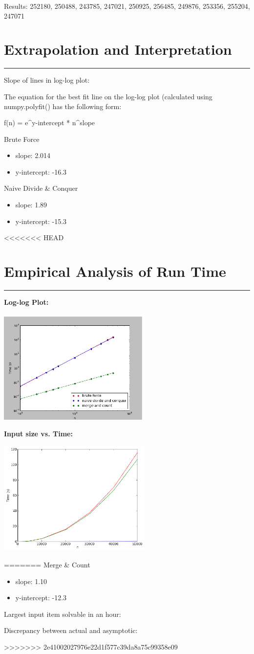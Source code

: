 \documentclass[letterpaper,10pt,titlepage,fleqn]{article}
\begin{document}
Results:
252180, 250488, 243785, 247021, 250925, 256485, 249876, 253356, 255204, 247071

\section*{Extrapolation and Interpretation}
\hrule

Slope of lines in log-log plot:

The equation for the best fit line on the log-log plot (calculated using numpy.polyfit() has the following form:

f(n) = e^y-intercept * n^slope

Brute Force
\begin{itemize}
\item slope: 2.014
\item y-intercept: -16.3
\end{itemize}

Naive Divide & Conquer
\begin{itemize}
\item slope: 1.89
\item y-intercept: -15.3
\end{itemize}

<<<<<<< HEAD
\section*{Empirical Analysis of Run Time}
\hrule

\textbf{Log-log Plot:}
\vskip 0.04in
\begin{center}
  \includegraphics[width=3in]{loglog.ps}
\end{center}

\textbf{Input size vs. Time:}
\vskip 0.04in
\begin{center}
  \includegraphics[width=3in]{input_time.ps}
\end{center}
=======
Merge & Count
\begin{itemize}
\item slope: 1.10
\item y-intercept: -12.3
\end{itemize}

Largest input item solvable in an hour:

Discrepancy between actual and asymptotic:

>>>>>>> 2e41002027976e22d1f577c39da8a75c99358e09
\end{document}
